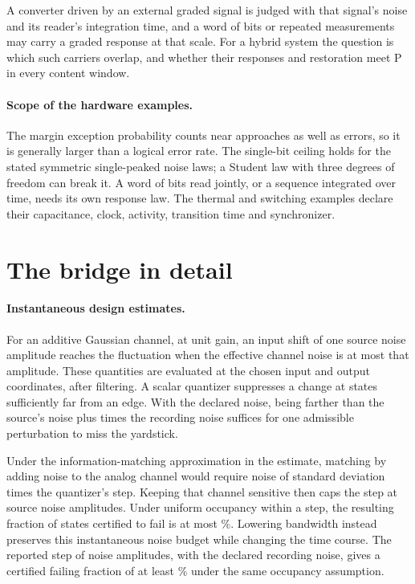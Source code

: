\documentclass[12pt]{article}
\begin{document}
A converter driven by an external graded signal is judged with that signal's
noise and its reader's integration time, and a word of bits or repeated
measurements may carry a graded response at that scale. For a hybrid system
the question is which such carriers overlap, and whether their responses and
restoration meet P in every content window.

\paragraph{Scope of the hardware examples.} The margin exception probability
counts near approaches as well as errors, so it is generally larger than a
logical error rate. The single-bit ceiling holds for the stated symmetric
single-peaked noise laws; a Student law with three degrees of freedom can break
it. A word of bits read jointly, or a sequence integrated over time, needs its
own response law. The thermal and switching examples declare their capacitance,
clock, activity, transition time and synchronizer.

\section{The bridge in detail}
\label{app:bridge}

\paragraph{Instantaneous design estimates.} For an additive Gaussian channel,
at unit gain, an input shift of one source noise amplitude reaches the
fluctuation when the effective channel noise is at most that amplitude.
These quantities are evaluated at the chosen input and output coordinates,
after filtering. A scalar quantizer suppresses a change at states sufficiently
far from an edge. With the declared noise, being farther than the source's
noise plus \ueEdgeQuantile{} times the recording noise suffices for one
admissible perturbation to miss the yardstick.

Under the information-matching approximation in the estimate, matching by
adding noise to the analog channel would require noise of standard deviation
\ueMatchedNoiseToStep{} times the quantizer's step.
Keeping that channel sensitive then caps the step at
\ueNoiseMatchMaxStep{} source noise amplitudes. Under uniform occupancy within
a step, the resulting fraction of states certified to fail is at most
\ueNoiseMatchFailPercent\%. Lowering bandwidth instead preserves this
instantaneous noise budget while changing the time course. The reported step
of \ueBridgeStepToNoise{} noise amplitudes, with the declared recording noise,
gives a certified failing fraction of at least \ueBandMatchFailPercent\% under
the same occupancy assumption.
\end{document}
